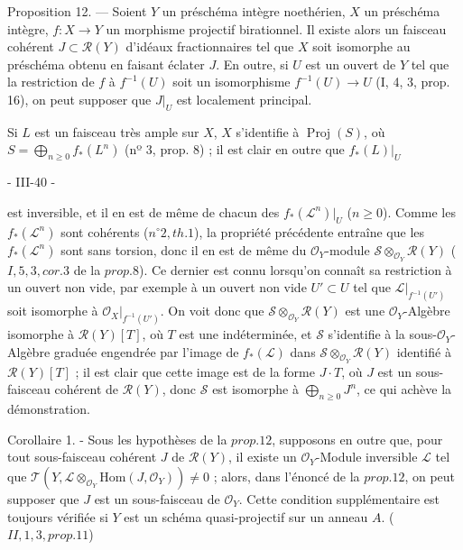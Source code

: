Proposition 12. — Soient $Y$ un préschéma intègre noethérien, $X$ un préschéma intègre, $f : X \to Y$ un morphisme projectif birationnel. Il existe alors un faisceau cohérent $J \subset \mathcal{R}(Y)$ d'idéaux fractionnaires tel que $X$ soit isomorphe au préschéma obtenu en faisant éclater $J$. En outre, si $U$ est un ouvert de $Y$ tel que la restriction de $f$ à $f^{-1}(U)$ soit un isomorphisme $f^{-1}(U) \to U$ (I, 4, 3, prop. 16), on peut supposer que $J|_U$ est localement principal.

Si $L$ est un faisceau très ample sur $X$, $X$ s'identifie à $\operatorname{Proj}(S)$, où $S = \bigoplus_{n \ge 0} f_* (L^n)$ (nº 3, prop. 8) ; il est clair en outre que $f_*(L)|_U$

\newpage


- III-40 -

est inversible, et il en est de même de chacun des $f_*(\mathcal{L}^n)|_U$ ($n \ge 0$). Comme les $f_*(\mathcal{L}^n)$ sont cohérents ($n^\circ 2, th. 1$), la propriété précédente entraîne que les $f_*(\mathcal{L}^n)$ sont sans torsion, donc il en est de même du $\mathcal{O}_Y$-module $\mathcal{S} \otimes_{\mathcal{O}_Y} \mathcal{R}(Y)$ ($I, 5, 3, cor. 3$ de la $prop. 8$). Ce dernier est connu lorsqu'on connaît sa restriction à un ouvert non vide, par exemple à un ouvert non vide $U' \subset U$ tel que $\mathcal{L}|_{f^{-1}(U')}$ soit isomorphe à $\mathcal{O}_X|_{f^{-1}(U')}$. On voit donc que $\mathcal{S} \otimes_{\mathcal{O}_Y} \mathcal{R}(Y)$ est une $\mathcal{O}_Y$-Algèbre isomorphe à $\mathcal{R}(Y)[T]$, où $T$ est une indéterminée, et $\mathcal{S}$ s'identifie à la sous-$\mathcal{O}_Y$-Algèbre graduée engendrée par l'image de $f_*(\mathcal{L})$ dans $\mathcal{S} \otimes_{\mathcal{O}_Y} \mathcal{R}(Y)$ identifié à $\mathcal{R}(Y)[T]$ ; il est clair que cette image est de la forme $J \cdot T$, où $J$ est un sous-faisceau cohérent de $\mathcal{R}(Y)$, donc $\mathcal{S}$ est isomorphe à $\bigoplus_{n \ge 0} J^n$, ce qui achève la démonstration.

Corollaire 1. - Sous les hypothèses de la $prop. 12$, supposons en outre que, pour tout sous-faisceau cohérent $J$ de $\mathcal{R}(Y)$, il existe un $\mathcal{O}_Y$-Module inversible $\mathcal{L}$ tel que $\mathcal{T}(Y, \mathcal{L} \otimes_{\mathcal{O}_Y} \text{Hom}(J, \mathcal{O}_Y)) \neq 0$ ; alors, dans l'énoncé de la $prop. 12$, on peut supposer que $J$ est un sous-faisceau de $\mathcal{O}_Y$. Cette condition supplémentaire est toujours vérifiée si $Y$ est un schéma quasi-projectif sur un anneau $A$. ($II, 1, 3, prop. 11$)

